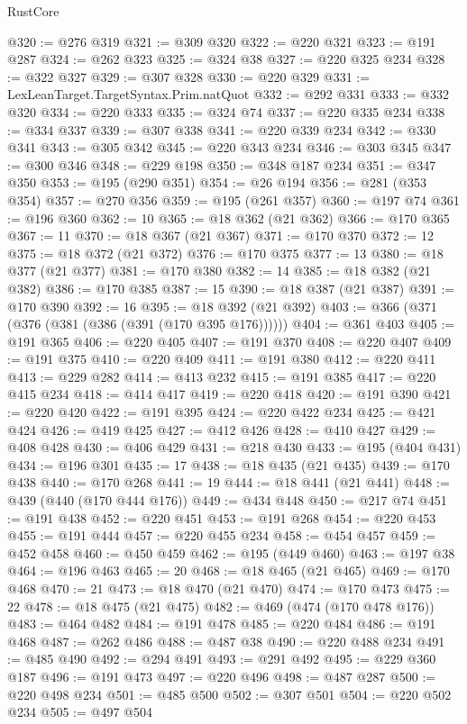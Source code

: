 \begin{lexlean}{RustCore}
\begin{coremodule}
@320 := @276 @319
@321 := @309 @320
@322 := @220 @321
@323 := @191 @287
@324 := @262 @323
@325 := @324 @38
@327 := @220 @325 @234
@328 := @322 @327
@329 := @307 @328
@330 := @220 @329
@331 := LexLeanTarget.TargetSyntax.Prim.natQuot
@332 := @292 @331
@333 := @332 @320
@334 := @220 @333
@335 := @324 @74
@337 := @220 @335 @234
@338 := @334 @337
@339 := @307 @338
@341 := @220 @339 @234
@342 := @330 @341
@343 := @305 @342
@345 := @220 @343 @234
@346 := @303 @345
@347 := @300 @346
@348 := @229 @198
@350 := @348 @187 @234
@351 := @347 @350
@353 := @195 (@290 @351)
@354 := @26 @194
@356 := @281 (@353 @354)
@357 := @270 @356
@359 := @195 (@261 @357)
@360 := @197 @74
@361 := @196 @360
@362 := 10
@365 := @18 @362 (@21 @362)
@366 := @170 @365
@367 := 11
@370 := @18 @367 (@21 @367)
@371 := @170 @370
@372 := 12
@375 := @18 @372 (@21 @372)
@376 := @170 @375
@377 := 13
@380 := @18 @377 (@21 @377)
@381 := @170 @380
@382 := 14
@385 := @18 @382 (@21 @382)
@386 := @170 @385
@387 := 15
@390 := @18 @387 (@21 @387)
@391 := @170 @390
@392 := 16
@395 := @18 @392 (@21 @392)
@403 := @366 (@371 (@376 (@381 (@386 (@391 (@170 @395 @176))))))
@404 := @361 @403
@405 := @191 @365
@406 := @220 @405
@407 := @191 @370
@408 := @220 @407
@409 := @191 @375
@410 := @220 @409
@411 := @191 @380
@412 := @220 @411
@413 := @229 @282
@414 := @413 @232
@415 := @191 @385
@417 := @220 @415 @234
@418 := @414 @417
@419 := @220 @418
@420 := @191 @390
@421 := @220 @420
@422 := @191 @395
@424 := @220 @422 @234
@425 := @421 @424
@426 := @419 @425
@427 := @412 @426
@428 := @410 @427
@429 := @408 @428
@430 := @406 @429
@431 := @218 @430
@433 := @195 (@404 @431)
@434 := @196 @301
@435 := 17
@438 := @18 @435 (@21 @435)
@439 := @170 @438
@440 := @170 @268
@441 := 19
@444 := @18 @441 (@21 @441)
@448 := @439 (@440 (@170 @444 @176))
@449 := @434 @448
@450 := @217 @74
@451 := @191 @438
@452 := @220 @451
@453 := @191 @268
@454 := @220 @453
@455 := @191 @444
@457 := @220 @455 @234
@458 := @454 @457
@459 := @452 @458
@460 := @450 @459
@462 := @195 (@449 @460)
@463 := @197 @38
@464 := @196 @463
@465 := 20
@468 := @18 @465 (@21 @465)
@469 := @170 @468
@470 := 21
@473 := @18 @470 (@21 @470)
@474 := @170 @473
@475 := 22
@478 := @18 @475 (@21 @475)
@482 := @469 (@474 (@170 @478 @176))
@483 := @464 @482
@484 := @191 @478
@485 := @220 @484
@486 := @191 @468
@487 := @262 @486
@488 := @487 @38
@490 := @220 @488 @234
@491 := @485 @490
@492 := @294 @491
@493 := @291 @492
@495 := @229 @360 @187
@496 := @191 @473
@497 := @220 @496
@498 := @487 @287
@500 := @220 @498 @234
@501 := @485 @500
@502 := @307 @501
@504 := @220 @502 @234
@505 := @497 @504

\end{coremodule}
\end{lexlean}
